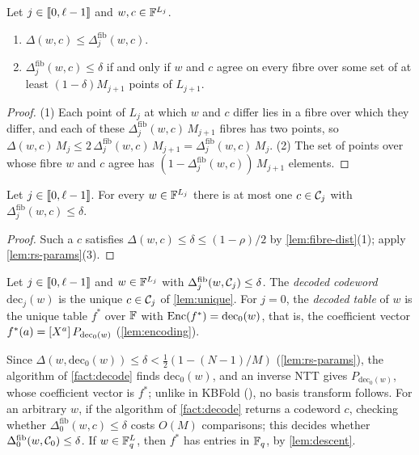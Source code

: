 \begin{lemma}\label{lem:fibre-dist}
Let $j \in \llbracket 0, \ell-1 \rrbracket$ and $w, c \in \mathbb{F}^{L_j}$.
\begin{enumerate}
  \item $\Delta(w,c) \le \Delta^{\mathrm{fib}}_j(w,c)$.
  \item $\Delta^{\mathrm{fib}}_j(w,c) \le \delta$ if and only if $w$ and $c$ agree on every fibre over some set of at least $(1-\delta)M_{j+1}$ points of $L_{j+1}$.
\end{enumerate}
\end{lemma}

\begin{proof}
(1) Each point of $L_j$ at which $w$ and $c$ differ lies in a fibre over which they differ, and each of these $\Delta^{\mathrm{fib}}_j(w,c)\,M_{j+1}$ fibres has two points, so $\Delta(w,c)\,M_j \le 2\,\Delta^{\mathrm{fib}}_j(w,c)\,M_{j+1} = \Delta^{\mathrm{fib}}_j(w,c)\,M_j$.
(2) The set of points over whose fibre $w$ and $c$ agree has $(1 - \Delta^{\mathrm{fib}}_j(w,c))\,M_{j+1}$ elements.
\end{proof}

\begin{lemma}\label{lem:unique}
Let $j \in \llbracket 0, \ell-1 \rrbracket$. For every $w \in \mathbb{F}^{L_j}$ there is at most one $c \in \mathcal{C}_j$ with $\Delta^{\mathrm{fib}}_j(w,c) \le \delta$.
\end{lemma}

\begin{proof}
Such a $c$ satisfies $\Delta(w,c) \le \delta \le (1-\rho)/2$ by \cref{lem:fibre-dist}(1); apply \cref{lem:rs-params}(3).
\end{proof}

\begin{definition}\label{def:decoded}
Let $j \in \llbracket 0, \ell-1 \rrbracket$ and $w \in \mathbb{F}^{L_j}$ with $\Delta^{\mathrm{fib}}_j(w, \mathcal{C}_j) \le \delta$.
The \emph{decoded codeword} $\mathrm{dec}_j(w)$ is the unique $c \in \mathcal{C}_j$ of \cref{lem:unique}.
For $j = 0$, the \emph{decoded table} of $w$ is the unique table $f^*$ over $\mathbb{F}$ with $\mathrm{Enc}(f^*) = \mathrm{dec}_0(w)$, that is, the coefficient vector $f^*(a) = [X^{a}]\,P_{\mathrm{dec}_0(w)}$ (\cref{lem:encoding}).
\end{definition}

\begin{remark}\label{rem:ext}
Since $\Delta(w, \mathrm{dec}_0(w)) \le \delta < \tfrac12(1 - (N-1)/M)$ (\cref{lem:rs-params}), the algorithm of \cref{fact:decode} finds $\mathrm{dec}_0(w)$, and an inverse NTT gives $P_{\mathrm{dec}_0(w)}$, whose coefficient vector is $f^*$; unlike in KBFold (), no basis transform follows.
For an arbitrary $w$, if the algorithm of \cref{fact:decode} returns a codeword $c$, checking whether $\Delta^{\mathrm{fib}}_0(w, c) \le \delta$ costs $O(M)$ comparisons; this decides whether $\Delta^{\mathrm{fib}}_0(w, \mathcal{C}_0) \le \delta$.
If $w \in \mathbb{F}_q^L$, then $f^*$ has entries in $\mathbb{F}_q$, by \cref{lem:descent}.
\end{remark}

